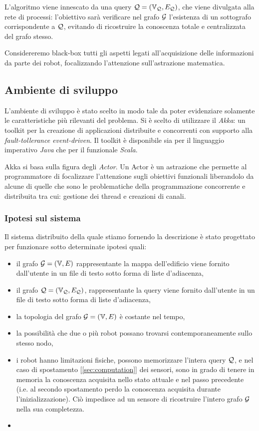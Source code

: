 \documentclass{llncs}
\begin{document}
L'algoritmo viene innescato da una query $\mathcal{Q} = (\mathbb{V}_{\mathcal{Q}}, E_{\mathcal{Q}})$, 
che viene divulgata alla rete di processi: l'obiettivo sarà verificare
nel grafo $\mathcal{G}$ l'esistenza di un sottografo corrispondente a $\mathcal{Q}$,
evitando di ricostruire la conoscenza totale e centralizzata del
grafo stesso.

Considereremo black-box tutti gli aspetti legati all'acquisizione delle informazioni 
da parte dei robot, focalizzando l'attenzione sull'astrazione matematica.



\subsection{Ambiente di sviluppo}
L'ambiente di sviluppo è stato scelto in modo tale da poter evidenziare solamente
le caratteristiche più rilevanti del problema. 
Si è scelto di utilizzare il \emph{Akka}: un toolkit per la creazione di applicazioni 
distribuite e concorrenti con supporto alla \emph{fault-tollerance event-driven}.
Il toolkit è disponibile sia per il linguaggio imperativo \emph{Java} che per il 
funzionale \emph{Scala}.

Akka si basa sulla figura degli \emph{Actor}. Un Actor è un astrazione che permette
al programmatore di focalizzare l'attenzione sugli obiettivi funzionali liberandolo 
da alcune di quelle che sono le  problematiche della programmazione 
concorrente e distribuita tra cui: gestione dei thread e creazioni di canali.
\subsubsection{Ipotesi sul sistema}
\label{sec:hypotesis}
Il sistema distribuito della quale stiamo fornendo la descrizione è stato progettato per funzionare 
sotto determinate ipotesi quali:
\begin{itemize}
	\item il grafo $\mathcal{G} = ( \mathbb{V}, E)$ rappresentante la mappa dell'edificio viene fornito dall'utente in un 
	file di testo sotto forma di liste d'adiacenza,
	\item il grafo  $\mathcal{Q} = (\mathbb{V}_{\mathcal{Q}}, E_{\mathcal{Q}})$,  rappresentante la query viene fornito dall'utente in un 
	file di testo sotto forma di liste d'adiacenza,
	\item la topologia del grafo $\mathcal{G} = ( \mathbb{V}, E)$ è costante nel tempo,
	\item la possibilità che due o più robot possano trovarsi contemporaneamente sullo stesso nodo,
	\item i robot hanno limitazioni fisiche, possono memorizzare l'intera  query $\mathcal{Q}$, e 
	nel caso di spostamento [\ref{sec:computation}] dei sensori, sono in grado di tenere in memoria la conoscenza acquisita nello stato attuale e nel passo precedente (i.e. al secondo spostamento perdo la conoscenza acquisita 
	durante l'inizializzazione). Ciò impedisce ad un sensore di ricostruire l'intero grafo $\mathcal{G}$ nella sua completezza.
	\item {}
\end{itemize}
\end{document}
